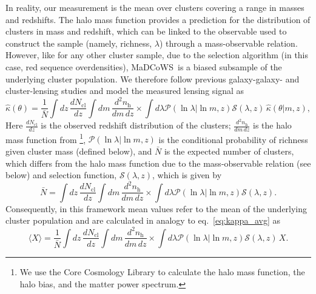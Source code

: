 \documentclass[preprint2]{aastex63}
\newcommand{\madcows}{MaDCoWS}
\newcommand{\observable}{\lambda}
\begin{document}
In reality, our measurement is the mean over clusters covering a range in masses and redshifts. The halo mass function provides a prediction for the distribution of clusters in mass and redshift, which can be linked to the observable used to construct the sample (namely, richness, $\observable$) through a mass-observable relation. However, like for any other cluster sample, due to the selection algorithm (in this case, red sequence overdensities), \madcows\ is a biased subsample of the underlying cluster population. We therefore follow previous galaxy-galaxy- and cluster-lensing studies \citep[e.g.,][]{vdbosch13,viola15,dvornik18,miyatake19} and model the measured lensing signal as
\begin{equation}\label{eq:kappa_avg}
    \hat\kappa(\theta) = \frac1{\bar N}\int dz \,\frac{dN_\mathrm{cl}}{dz}\int dm \,\frac{d^2n_\mathrm{h}}{dm\,dz} %
    \times
    \int d\observable \mathcal{P}(\ln\observable|\ln m,z)\mathcal{S}(\observable,z)\,\hat\kappa(\theta|m,z),
\end{equation}
Here $\frac{dN_\mathrm{cl}}{dz}$ is the observed redshift distribution of the clusters; $\frac{d^2n_\mathrm{h}}{dm\,dz}$ is the halo mass function from \cite{tinker10}\footnote{We use the Core Cosmology Library \citep[\url{https://ccl.readthedocs.io/en/latest/}]{CCL} to calculate the halo mass function, the halo bias, and the matter power spectrum.}, $\mathcal{P}(\ln\observable|\ln m,z)$ is the conditional probability of richness given cluster mass (defined below), and $\bar N$ is the expected number of clusters, which differs from the halo mass function due to the mass-observable relation (see below) and selection function, $\mathcal{S}(\observable,z)$, which is given by
\begin{equation}\label{eq:nbar}
    \bar N = \int dz \,\frac{dN_\mathrm{cl}}{dz}\int dm \,\frac{d^2n_\mathrm{h}}{dm\,dz} %
    \times
    \int d\observable \mathcal{P}(\ln\observable|\ln m,z)\mathcal{S}(\observable,z).
\end{equation}
%
Consequently, in this framework mean values refer to the mean of the underlying cluster population and are calculated in analogy to eq.~\ref{eq:kappa_avg} as
\begin{equation}\label{eq:avg}
    \langle X\rangle = \frac1{\bar N}\int dz \, \frac{dN_\mathrm{cl}}{dz}\int dm \,\frac{d^2n_\mathrm{h}}{dm\,dz} %
    \times
    \int d\observable \mathcal{P}(\ln\observable|\ln m,z)\mathcal{S}(\observable,z) \,X.
\end{equation}
\end{document}
